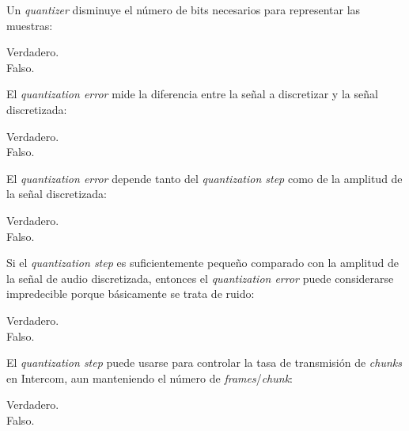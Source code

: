 \documentclass[legalpaper, 12pt, addpoints]{exam}
\begin{document}
\begin{questions}
\vspace{0.10in}

\question Un \emph{quantizer} disminuye el número de bits necesarios
para representar las muestras:

\begin{oneparchoices}
  \choice Verdadero.\\
  \choice Falso.
\end{oneparchoices}
  
\vspace{0.10in}

\question El \emph{quantization error} mide la diferencia entre la
señal a discretizar y la señal discretizada:

\begin{oneparchoices}
  \choice Verdadero.\\
  \choice Falso.
\end{oneparchoices}
  
\vspace{0.10in}

\question El \emph{quantization error} depende tanto del
\emph{quantization step} como de la amplitud de la señal discretizada:

\begin{oneparchoices}
  \choice Verdadero.\\
  \choice Falso.
\end{oneparchoices}
  
\vspace{0.10in}

\question Si el \emph{quantization step} es suficientemente pequeño
comparado con la amplitud de la señal de audio discretizada, entonces
el \emph{quantization error} puede considerarse impredecible porque
básicamente se trata de ruido:

\begin{oneparchoices}
  \choice Verdadero.\\
  \choice Falso.
\end{oneparchoices}
  
\vspace{0.10in}

\question El \emph{quantization step} puede usarse para controlar la
tasa de transmisión de \emph{chunks} en Intercom, aun manteniendo el
número de \emph{frames}/\emph{chunk}:

\begin{oneparchoices}
  \choice Verdadero.\\
  \choice Falso.
\end{oneparchoices}
  

\end{questions}
\end{document}
